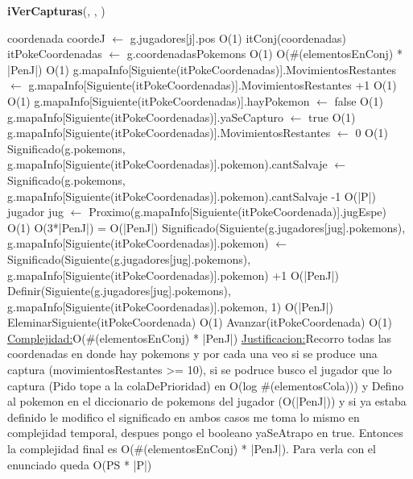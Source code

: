 \begin{Algoritmos}
\begin{algorithm}[H]{\textbf{iVerCapturas}(, , )}
	\begin{algorithmic}[1]
		\State coordenada coordeJ $\gets$ g.jugadores[j].pos \Comment O(1)
		\State itConj(coordenadas) itPokeCoordenadas $\gets$ g.coordenadasPokemons \Comment O(1)
		 \Comment O($\#$(elementosEnConj) * |PenJ|)
			 \Comment O(1)
				\State g.mapaInfo[Siguiente(itPokeCoordenadas)].MovimientosRestantes $\gets$ g.mapaInfo[Siguiente(itPokeCoordenadas)].MovimientosRestantes +1 \Comment O(1)
				 \Comment O(1) 
					\State g.mapaInfo[Siguiente(itPokeCoordenadas)].hayPokemon $\gets$ false \Comment O(1)						
					\State g.mapaInfo[Siguiente(itPokeCoordenadas)].yaSeCapturo $\gets$ true \Comment O(1)	
					\State g.mapaInfo[Siguiente(itPokeCoordenadas)].MovimientosRestantes $\gets$ 0 \Comment O(1)									
					\State Significado(g.pokemons, g.mapaInfo[Siguiente(itPokeCoordenadas)].pokemon).cantSalvaje $\gets$ Significado(g.pokemons, g.mapaInfo[Siguiente(itPokeCoordenadas)].pokemon).cantSalvaje -1 \Comment O(|P|)		
					\State jugador jug $\gets$ Proximo(g.mapaInfo[Siguiente(itPokeCoordenada)].jugEspe) \Comment O(1)
					 \Comment O(3*|PenJ|) = O(|PenJ|)												\State Significado(Siguiente(g.jugadores[jug].pokemons), g.mapaInfo[Siguiente(itPokeCoordenadas)].pokemon) $\gets$ Significado(Siguiente(g.jugadores[jug].pokemons), g.mapaInfo[Siguiente(itPokeCoordenadas)].pokemon)	+1 \Comment O(|PenJ|)											\Else
						\State Definir(Siguiente(g.jugadores[jug].pokemons), g.mapaInfo[Siguiente(itPokeCoordenadas)].pokemon, 1) \Comment O(|PenJ|)
					\EndIf 			
				\EndIf
				\State EleminarSiguiente(itPokeCoordenada) \Comment O(1) 				
			\Else
				\State Avanzar(itPokeCoordenada) \Comment O(1)				
			\EndIf
		\EndWhile
		\medskip
		\Statex \underline{Complejidad:}O($\#$(elementosEnConj) * |PenJ|)
		\Statex \underline{Justificacion:}Recorro todas las coordenadas en donde hay pokemons y por cada una veo si se produce una captura (movimientosRestantes >= 10), si se podruce busco el jugador que lo captura (Pido tope a la colaDePrioridad) en O(log $\#$(elementosCola))) y Defino al pokemon en el diccionario de pokemons del jugador (O(|PenJ|)) y si ya estaba definido le modifico el significado en ambos casos me toma lo mismo en complejidad temporal, despues pongo el booleano yaSeAtrapo en true. Entonces la complejidad final es O($\#$(elementosEnConj) * |PenJ|). Para verla con el enunciado queda O(PS * |P|) 
	\end{algorithmic}
\end{algorithm}


\end{Algoritmos}
